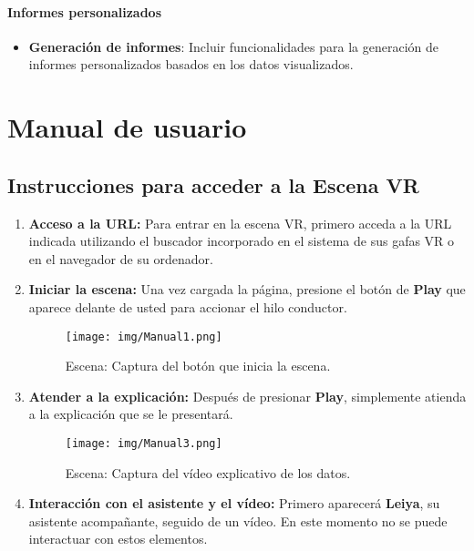 \documentclass[a4paper, 12pt]{book}
\begin{document}
\subsubsection{Informes personalizados}

\begin{itemize}
    \item \textbf{Generación de informes}: Incluir funcionalidades para la generación de informes personalizados basados en los datos visualizados.
\end{itemize}




\cleardoublepage
\appendix
\chapter{Manual de usuario}
\label{app:manual_usuario}
\section*{Instrucciones para acceder a la Escena VR}

\begin{enumerate}
    \item \textbf{Acceso a la URL:} 
    Para entrar en la escena VR, primero acceda a la URL indicada utilizando el buscador incorporado en el sistema de sus gafas VR o en el navegador de su ordenador.
    
    \item \textbf{Iniciar la escena:} 
    Una vez cargada la página, presione el botón de \textbf{Play} que aparece delante de usted para accionar el hilo conductor.
    \begin{figure}[H]
        \centering
        \texttt{[image: img/Manual1.png]}
        \caption{Escena: Captura del botón que inicia la escena.}
        \label{fig:Manual1}
    \end{figure}
    
    \item \textbf{Atender a la explicación:} 
    Después de presionar \textbf{Play}, simplemente atienda a la explicación que se le presentará.

    \begin{figure}[H]
        \centering
        \texttt{[image: img/Manual3.png]}
        \caption{Escena: Captura del vídeo explicativo de los datos.}
        \label{fig:Manual3}
    \end{figure}
    
    \item \textbf{Interacción con el asistente y el vídeo:} 
    Primero aparecerá \textbf{Leiya}, su asistente acompañante, seguido de un vídeo. En este momento no se puede interactuar con estos elementos. 
\end{enumerate}
\end{document}
